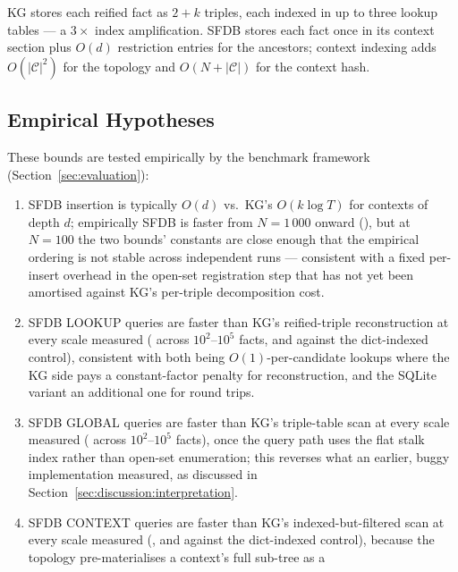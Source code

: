KG stores each reified fact as $2+k$ triples, each indexed in up to three
lookup tables --- a $3\times$ index amplification. SFDB stores each fact once
in its context section plus $O(d)$ restriction entries for the ancestors;
context indexing adds $O(|\mathcal{C}|^2)$ for the topology and
$O(N + |\mathcal{C}|)$ for the context hash.

\subsection{Empirical Hypotheses}
\label{sec:complexity:hypotheses}

These bounds are tested empirically by the benchmark framework
(Section~\ref{sec:evaluation}):

\begin{enumerate}
    \item SFDB insertion is typically $O(d)$ vs.\ KG's $O(k \log T)$ for contexts
          of depth $d$; empirically SFDB is faster from $N=1\,000$
          onward (\rangeinsertkg{}), but at $N=100$ the two bounds'
          constants are close enough that the empirical ordering is not
          stable across independent runs --- consistent with a fixed
          per-insert overhead in the
          open-set registration step that has not yet been amortised
          against KG's per-triple decomposition cost.
    \item SFDB LOOKUP queries are faster than KG's reified-triple
          reconstruction at every scale measured (\rangelookupkg{} across
          $10^2$--$10^5$ facts, and \rangelookupkgmem{} against the
          dict-indexed control), consistent with both being
          $O(1)$-per-candidate lookups where the KG side pays a
          constant-factor penalty for reconstruction, and the SQLite
          variant an additional one for round trips.
    \item SFDB GLOBAL queries are faster than KG's triple-table scan at
          every scale measured (\rangeglobalkg{} across $10^2$--$10^5$
          facts), once the query path uses the flat stalk index rather
          than open-set enumeration; this reverses what an earlier, buggy
          implementation measured, as discussed in
          Section~\ref{sec:discussion:interpretation}.
    \item SFDB CONTEXT queries are faster than KG's indexed-but-filtered
          scan at every scale measured (\rangecontextkg{}, and
          \rangecontextkgmem{} against the dict-indexed control), because
          the topology pre-materialises a context's full sub-tree as a

\end{enumerate}
